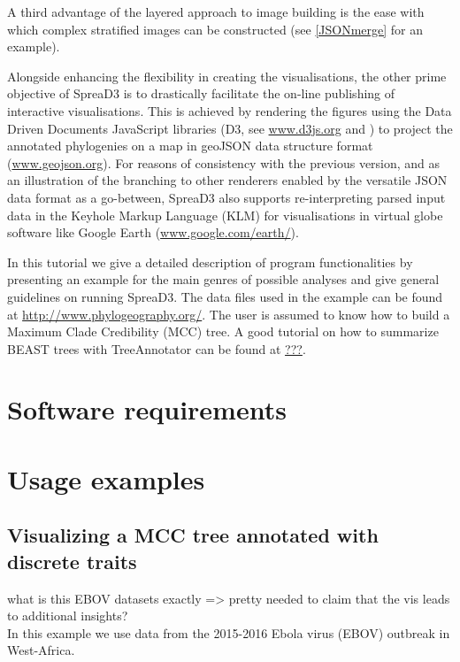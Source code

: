 \documentclass[english]{paper}
\begin{document}
A third advantage of the layered approach to image building is the ease with which complex stratified images can be constructed (see \ref{JSONmerge} for an example). 
\par
Alongside enhancing the flexibility in creating the visualisations, the other prime objective of SpreaD3 is to drastically facilitate the on-line publishing of interactive visualisations.
This is achieved by rendering the figures using the Data Driven Documents JavaScript libraries (D3, see \url{www.d3js.org} and \citet{Bostock:2011aa}) to project the annotated phylogenies on a map in geoJSON data structure format (\url{www.geojson.org}).
For reasons of consistency with the previous version, and as an illustration of the branching to other renderers enabled by the versatile JSON data format as a go-between, SpreaD3 also supports re-interpreting parsed input data in the Keyhole Markup Language (KLM) for visualisations in virtual globe software like Google Earth (\url{www.google.com/earth/}). 


\par
In this tutorial we give a detailed description of program functionalities by presenting an example for the main genres of possible analyses and give general guidelines on running SpreaD3. 
The data files used in the example can be found at \url{http://www.phylogeography.org/}.
The user is assumed to know how to build a Maximum Clade Credibility (MCC) tree. 
A good tutorial on how to summarize BEAST trees with TreeAnnotator can be found at \url{???}.

\section{Software requirements}

\section{Usage examples}
% 
% 

\subsection{Visualizing a MCC tree annotated with discrete traits}
% 
% 
what is this EBOV datasets exactly => pretty needed to claim that the vis leads to additional insights? 
\\
In this example we use data from the 2015-2016 Ebola virus (EBOV) outbreak in West-Africa. 
\end{document}
